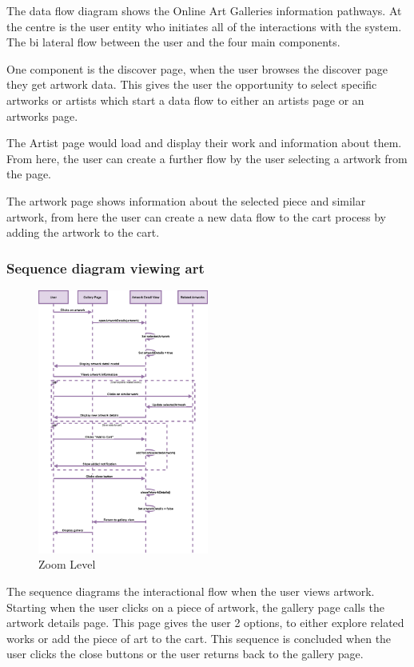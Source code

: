 \documentclass[]{project_final}
\begin{document}
The data flow diagram shows the Online Art Galleries information pathways.
At the centre is the user entity who initiates all of the interactions with the system. The bi lateral flow between the user and the four main components.

One component is the discover page, when the user browses the discover page they get artwork data. This gives the user the opportunity to select specific artworks or artists which start a data flow to either an artists page or an artworks page.

The Artist page would load and display their work and information about them. From here, the user can create a further flow by the user selecting a artwork from the page.

The artwork page shows information about the selected piece and similar artwork, from here the user can create a new data flow to the cart process by adding the artwork to the cart.


\newpage
\subsubsection{Sequence diagram viewing art}

\begin{figure}[ht!]
    \centering
    \includegraphics[width=0.5\textwidth]{AGSequenceDiagramViewingArtWork.png}
    \vspace*{0.0cm}
    \caption{Zoom Level}
    \label{fig:1}
\end{figure}
The sequence diagrams the interactional flow when the user views artwork. Starting when the user clicks on a piece of artwork, the gallery page calls the artwork details page. This page gives the user 2 options, to either explore related works or add the piece of art to the cart.
This sequence is concluded when the user clicks the close buttons or the user returns back to the gallery page.
\newpage
\end{document}
